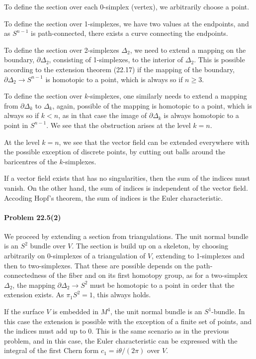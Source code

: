 \documentclass[a4paper,12pt]{article}
\newcommand{\problem}[1]{\paragraph{Problem #1}}
\begin{document}
To define the section over each 0-simplex (vertex), we arbitrarily choose a point.

To define the section over 1-simplexes, we have two values at the endpoints, and as $S^{n-1}$ is path-connected, there exists a curve connecting the endpoints.

To define the section over 2-simplexes $\Delta_2$, we need to extend a mapping on the boundary, $\partial \Delta_2$, consisting of 1-simplexes, to the interior of $\Delta_2$. This is possible according to the extension theorem (22.17) if the mapping of the boundary, $\partial\Delta_2 \to S^{n-1}$ is homotopic to a point, which is always so if $n\ge 3$.

To define the section over $k$-simplexes, one similarly needs to extend a mapping from $\partial \Delta_k$ to $\Delta_k$, again, possible of the mapping is homotopic to a point, which is always so if $k < n$, as in that case the image of $\partial \Delta_k$ is always homotopic to a point in $S^{n-1}$. We see that the obstruction arises at the level $k=n$.

At the level $k=n$, we see that the vector field can be extended everywhere with the possible exception of discrete points, by cutting out balls around the baricentres of the $k$-simplexes.

If a vector field exists that has no singularities, then the sum of the indices must vanish. On the other hand, the sum of indices is independent of the vector field. Accoding Hopf's theorem, the sum of indices is the Euler characteristic.


\problem{22.5(2)} We proceed by extending a section from triangulations. The unit normal bundle is an $S^2$ bundle over $V$. The section is build up on a skeleton, by choosing arbitrarily on 0-simplexes of a triangulation of $V$, extending to 1-simplexes and then to two-simplexes. That these are possible depends on the path-connectedness of the fiber and on its first homotopy group, as for a two-simplex $\Delta_2$, the mapping $\partial \Delta_2 \to S^2$ must be homotopic to a point in order that the extension exists. As $\pi_1 S^2=1$, this always holds.

If the surface $V$ is embedded in $M^4$, the unit normal bundle is an $S^1$-bundle. In this case the extension is possible with the exception of a finite set of points, and the indices must add up to 0. This is the same scenario as in the previous problem, and in this case, the Euler characteristic can be expressed with the integral of the first Chern form $c_1 = i\theta/(2\pi)$ over $V$.
\end{document}
